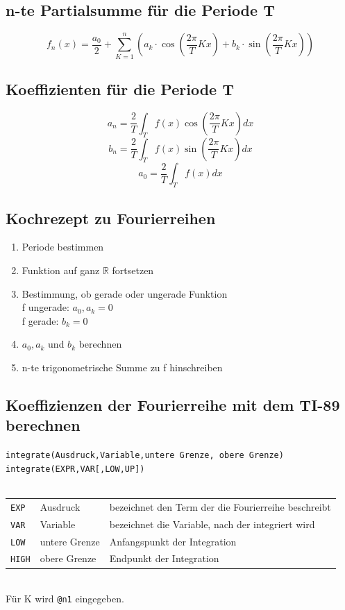 \subsection{n-te Partialsumme für die Periode T}
\[ \boxed{f_n(x) = \frac{a_0}{2} + \sum_{K=1}^n \left(a_k \cdot \cos \left(\frac{2 \pi}{T} K x\right) + b_k \cdot \sin\left(\frac{2 \pi}{T} K x\right)\right)} \]

\subsection{Koeffizienten für die Periode T}
\[ \boxed{a_n = \frac{2}{T} \int_T f(x) \cos(\frac{2 \pi}{T} K x) dx} \]
\[ \boxed{b_n = \frac{2}{T} \int_T f(x) \sin(\frac{2 \pi}{T} K x) dx} \]
\[ \boxed{a_0 = \frac{2}{T} \int_T f(x) dx
} \]

\subsection{Kochrezept zu Fourierreihen}
\begin{enumerate}
  \item Periode bestimmen
  \item Funktion auf ganz $\mathbb{R}$ fortsetzen
  \item Bestimmung, ob gerade oder ungerade Funktion\\
  f ungerade: $a_0, a_k = 0$\\
  f gerade: $b_k = 0$
  \item $a_0, a_k$ und $b_k$ berechnen
  \item n-te trigonometrische Summe zu f hinschreiben
\end{enumerate}

\ifti
\subsection{Koeffizienzen der Fourierreihe mit dem TI-89 berechnen}
\verb?integrate(Ausdruck,Variable,untere Grenze, obere Grenze)? \\
\verb?integrate(EXPR,VAR[,LOW,UP])? \\\\
\begin{tabular}{@{}lll}
\verb?EXP?  & Ausdruck      & bezeichnet den Term der die Fourierreihe beschreibt \\
\verb?VAR?  & Variable      & bezeichnet die Variable, nach der integriert wird \\
\verb?LOW?  & untere Grenze & Anfangspunkt der Integration \\
\verb?HIGH? & obere Grenze  & Endpunkt der Integration \\
\end{tabular}\\
Für K wird \verb?@n1? eingegeben. 
\fi
\ifnspire
